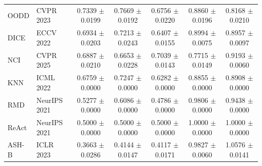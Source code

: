 \begin{table}[t]
{\begin{tabular}{llccccc}
OODD & CVPR 2023 & 0.7339 $\pm$ 0.0199 & 0.7669 $\pm$ 0.0192 & 0.6756 $\pm$ 0.0220 & 0.8860 $\pm$ 0.0196 & 0.8168 $\pm$ 0.0210 \\
DICE & ECCV 2022 & 0.6934 $\pm$ 0.0203 & 0.7213 $\pm$ 0.0243 & 0.6407 $\pm$ 0.0155 & 0.8994 $\pm$ 0.0075 & 0.8957 $\pm$ 0.0097 \\
NCI & CVPR 2025 & 0.6887 $\pm$ 0.0210 & 0.6653 $\pm$ 0.0228 & 0.7039 $\pm$ 0.0143 & 0.7715 $\pm$ 0.0149 & 0.9193 $\pm$ 0.0060 \\
KNN & ICML 2022 & 0.6759 $\pm$ 0.0000 & 0.7247 $\pm$ 0.0000 & 0.6282 $\pm$ 0.0000 & 0.8855 $\pm$ 0.0000 & 0.8908 $\pm$ 0.0000 \\
RMD & NeurIPS 2021 & 0.5277 $\pm$ 0.0000 & 0.6086 $\pm$ 0.0000 & 0.4786 $\pm$ 0.0000 & 0.9806 $\pm$ 0.0000 & 0.9438 $\pm$ 0.0000 \\
ReAct & NeurIPS 2021 & 0.5000 $\pm$ 0.0000 & 0.5000 $\pm$ 0.0000 & 0.5000 $\pm$ 0.0000 & 1.0000 $\pm$ 0.0000 & 1.0000 $\pm$ 0.0000 \\
ASH-B & ICLR 2023 & 0.3663 $\pm$ 0.0286 & 0.4144 $\pm$ 0.0147 & 0.4117 $\pm$ 0.0171 & 0.9827 $\pm$ 0.0060 & 1.0576 $\pm$ 0.0141 \\
\bottomrule
\end{tabular}%
}
\end{table}

